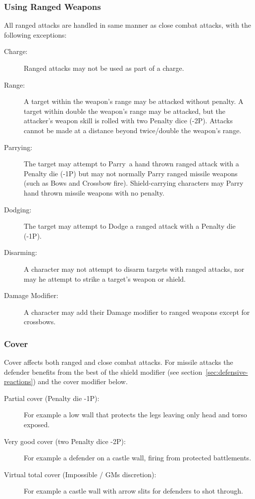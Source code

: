 \subsubsection{Using Ranged Weapons}
All ranged attacks are handled in same manner as close combat attacks, with the following exceptions: 
\begin{description}
\item[Charge:] Ranged attacks may not be used as part of a charge.
\item[Range:] A target within the weapon’s range may be attacked without penalty. A target within double the weapon’s range may be attacked, but the attacker’s weapon skill is rolled with two Penalty dice (-2P). Attacks cannot be made at a distance beyond twice/double the weapon’s range.
\item[Parrying:] The target may attempt to Parry a hand thrown ranged attack with a Penalty die (-1P) but may not normally Parry ranged missile weapons (such as Bows and Crossbow fire). Shield-carrying characters may Parry hand thrown missile weapons with no penalty.
\item[Dodging:] The target may attempt to Dodge a ranged attack with a Penalty die (-1P).
\item[Disarming:] A character may not attempt to disarm targets with ranged attacks, nor may he attempt to strike a target’s weapon or shield.
\item[Damage Modifier:] A character may add their Damage modifier to ranged weapons except for crossbows.

\end{description}

\subsubsection{Cover}
Cover affects both ranged and close combat attacks. For missile attacks the defender benefits from the best of the shield modifier (see section~\ref{sec:defensive-reactions}) and the cover modifier below.

\begin{description}
	\item[Partial cover (Penalty die -1P):] For example a low wall that protects the legs leaving only head and torso exposed.
	\item[Very good cover (two Penalty dice -2P):] For example a defender on a castle wall, firing from protected battlements.
	\item[Virtual total cover (Impossible / GMs discretion):] For example a castle wall with arrow slits for defenders to shot through.
\end{description}


